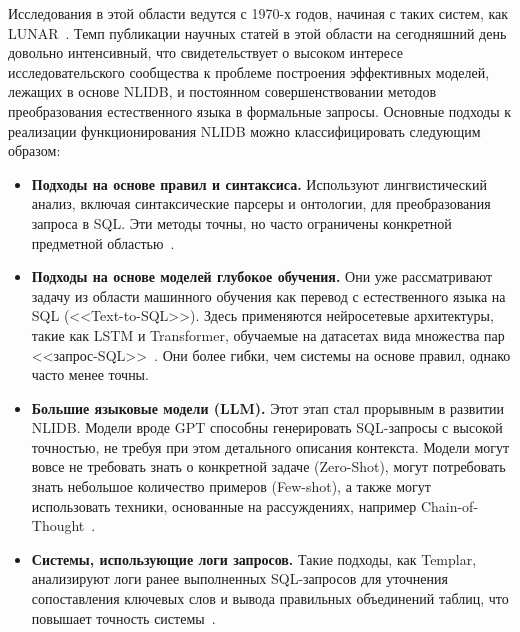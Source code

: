 Исследования в этой области ведутся с 1970-х годов, начиная с таких систем,
как LUNAR~\cite{kimNaturalLanguageSQL2020,liuNLI4DBSystematicReview2025, zhuLargeLanguageModel2024}.
Темп публикации научных
статей в этой области на сегодняшний день довольно интенсивный, что свидетельствует о
высоком интересе исследовательского сообщества
к проблеме построения эффективных моделей, лежащих в основе NLIDB, и постоянном совершенствовании методов
преобразования естественного языка в формальные запросы.
Основные подходы к реализации функционирования NLIDB можно классифицировать следующим образом:
\begin{itemize}
	\item \textbf{Подходы на основе правил и синтаксиса.} Используют лингвистический анализ,
	      включая синтаксические парсеры и онтологии, для преобразования запроса в SQL.
	      Эти методы точны, но часто ограничены конкретной предметной
	      областью~\cite{anisyahNaturalLanguageInterface2019, poetraNaturalLanguageInterface2019,
		      hamazNovelMethodProviding2017, pazosr.ComparativeStudyCustomization2016,
		      baskaranSyntaticSemanticVisual2013}.
	\item \textbf{Подходы на основе моделей глубокое обучения.} Они уже рассматривают задачу
	      из области машинного обучения как перевод с
	      естественного языка на SQL (<<Text-to-SQL>>). Здесь применяются нейросетевые архитектуры,
	      такие как LSTM и Transformer, обучаемые на датасетах
	      вида множества пар <<запрос-SQL>>~\cite{bradDatasetNeuralNatural2017,
		      visperasModernTexttoSQLSemantic2023}. Они более гибки, чем системы на основе правил,
	      однако часто менее точны.
	\item \textbf{Большие языковые модели (LLM).} Этот этап стал прорывным в развитии NLIDB.
	      Модели вроде GPT способны генерировать SQL-запросы с высокой точностью, не требуя
	      при этом детального описания контекста. Модели могут вовсе не требовать знать о конкретной
	      задаче (Zero-Shot), могут потребовать знать небольшое количество примеров (Few-shot), а также
	      могут использовать техники, основанные на рассуждениях, например
	      Chain-of-Thought~\cite{liCodeSBuildingOpensource2024,
		      zhuLargeLanguageModel2024}.
	\item \textbf{Системы, использующие логи запросов.} Такие подходы, как Templar,
	      анализируют логи ранее выполненных SQL-запросов для уточнения сопоставления
	      ключевых слов и вывода правильных объединений таблиц, что повышает точность
	      системы~\cite{baikBridgingSemanticGap2019,kimNaturalLanguageSQL2020}.
\end{itemize}

